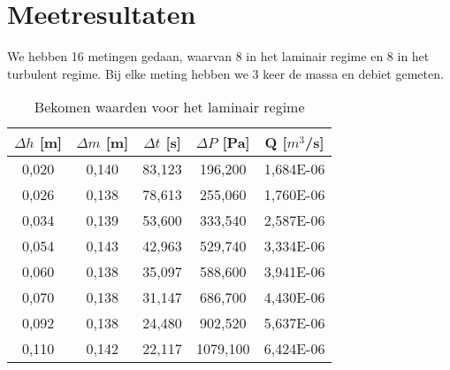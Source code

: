 \section{Meetresultaten}

We hebben 16 metingen gedaan, waarvan 8 in het laminair regime en 
8 in het turbulent regime. Bij elke meting hebben we 3 keer de massa en
debiet gemeten.

\begin{table}
    \centering
    \caption{Bekomen waarden voor het laminair regime}
    \begin{tabular}{| c | c | c | c | c |}
        \hline
        $\Delta h$ [m]  & $\Delta m$ [m]    & $\Delta t$ [s]    & $\Delta P$ [Pa]   & Q [$m^3$/s]      \\ \hline
        0,020           & 0,140             & 83,123            & 196,200           & 1,684E-06        \\ \hline
        0,026           & 0,138             & 78,613            & 255,060           & 1,760E-06         \\ \hline
        0,034           & 0,139             & 53,600            & 333,540           & 2,587E-06         \\ \hline
        0,054           & 0,143             & 42,963            & 529,740           & 3,334E-06         \\ \hline 
        0,060           & 0,138             & 35,097            & 588,600           & 3,941E-06         \\ \hline
        0,070           & 0,138             & 31,147            & 686,700           & 4,430E-06         \\ \hline
        0,092           & 0,138             & 24,480            & 902,520           & 5,637E-06         \\ \hline
        0,110           & 0,142             & 22,117            & 1079,100          & 6,424E-06         \\ \hline
    \end{tabular}
\end{table}

